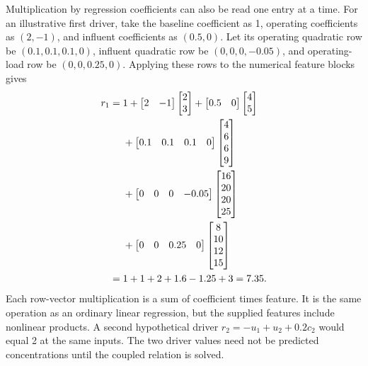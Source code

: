 Multiplication by regression coefficients can also be read one entry at a time. For an illustrative first driver, take the baseline coefficient as 1, operating coefficients as \((2,-1)\), and influent coefficients as \((0.5,0)\). Let its operating quadratic row be \((0.1,0.1,0.1,0)\), influent quadratic row be \((0,0,0,-0.05)\), and operating-load row be \((0,0,0.25,0)\). Applying these rows to the numerical feature blocks gives
\begin{equation}
\equationname{Numerical evaluation of an illustrative regression driver}
\label{eq:icsor_driver_multiplication_example}
\begin{aligned}
r_1={}&1+\begin{bmatrix}2&-1\end{bmatrix}\begin{bmatrix}2\\3\end{bmatrix}
+\begin{bmatrix}0.5&0\end{bmatrix}\begin{bmatrix}4\\5\end{bmatrix}\\
&+\begin{bmatrix}0.1&0.1&0.1&0\end{bmatrix}\begin{bmatrix}4\\6\\6\\9\end{bmatrix}\\
&+\begin{bmatrix}0&0&0&-0.05\end{bmatrix}\begin{bmatrix}16\\20\\20\\25\end{bmatrix}\\
&+\begin{bmatrix}0&0&0.25&0\end{bmatrix}\begin{bmatrix}8\\10\\12\\15\end{bmatrix}\\
={}&1+1+2+1.6-1.25+3=7.35.
\end{aligned}
\end{equation}
Each row-vector multiplication is a sum of coefficient times feature. It is the same operation as an ordinary linear regression, but the supplied features include nonlinear products. A second hypothetical driver \(r_2=-u_1+u_2+0.2c_2\) would equal 2 at the same inputs. The two driver values need not be predicted concentrations until the coupled relation is solved.

